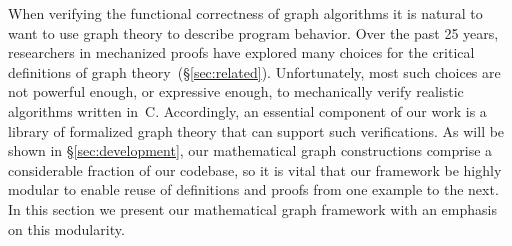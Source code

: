 \documentclass[acmsmall,screen]{acmart}
\newcommand\hide[1]{}
\begin{document}
When verifying the functional correctness of graph algorithms it is natural
to want to use graph theory to describe
program behavior.
Over the past 25 years, researchers in mechanized proofs have explored many choices for the 
critical definitions of graph theory~(\S\ref{sec:related}).  Unfortunately, most such choices
are not powerful enough, or expressive enough, to mechanically verify realistic algorithms 
written in~C.
Accordingly, an essential component of our
work is a library of formalized graph theory that can support such verifications.
As will be shown in \S\ref{sec:development}, our mathematical
graph constructions comprise a considerable fraction of our
codebase, so it is vital that our framework be highly modular to
enable reuse of definitions and proofs from one
example to the next. In this section we present our mathematical graph
framework with an emphasis on this modularity.

\hide{\color{magenta} We continue to use Union-Find from
\S\ref{sec:orientation} as our motivating example.} 

\hide{As will be shown in \S\ref{sec:development}, our mathematical
graph constructions comprise a considerable fraction of our
codebase. Indeed, as discussed in \S\ref{sec:related},
25 years of research into mechanized graph theory can
be summarized as ``it is a little tricky''.
First, as demonstrated in \S\ref{sec:orientation},
our development is expressive and powerful enough to verify realistic
algorithms---that is, it actually works in an end-to-end system.
Second, we have taken considerable care to develop a modular and
general-purpose framework for such mathematical graphs to allow
such verifications to be mechanized without undue pain.
Accordingly, in this section we will present our framework
at a high level to communicate the overall architecture rather
than focusing on the nitty-gritty details.} 
\end{document}
